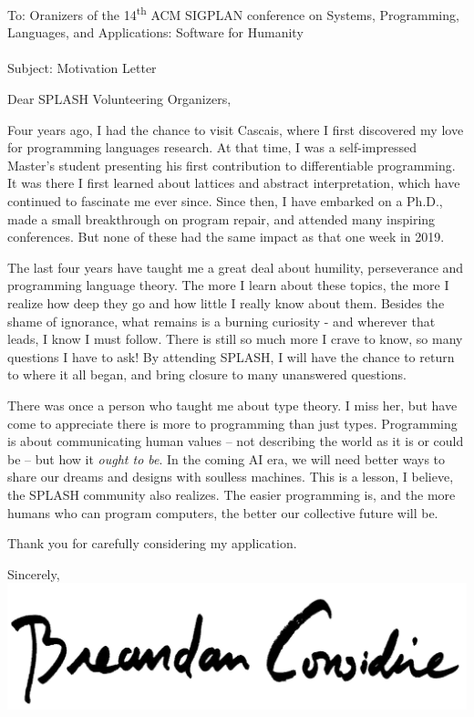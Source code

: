 \documentclass{letter}
\begin{document}
    \begin{letter}{To: Oranizers of the 14\textsuperscript{th} ACM SIGPLAN conference on Systems, Programming, Languages, and Applications: Software for Humanity\\\phantom{.}\\Subject: Motivation Letter\\}
        \opening{Dear SPLASH Volunteering Organizers,}
        Four years ago, I had the chance to visit Cascais, where I first discovered my love for programming languages research. At that time, I was a self-impressed Master’s student presenting his first contribution to differentiable programming. It was there I first learned about lattices and abstract interpretation, which have continued to fascinate me ever since. Since then, I have embarked on a Ph.D., made a small breakthrough on program repair, and attended many inspiring conferences. But none of these had the same impact as that one week in 2019.

        The last four years have taught me a great deal about humility, perseverance and programming language theory. The more I learn about these topics, the more I realize how deep they go and how little I really know about them. Besides the shame of ignorance, what remains is a burning curiosity - and wherever that leads, I know I must follow. There is still so much more I crave to know, so many questions I have to ask! By attending SPLASH, I will have the chance to return to where it all began, and bring closure to many unanswered questions.

        There was once a person who taught me about type theory. I miss her, but have come to appreciate there is more to programming than just types. Programming is about communicating human values -- not describing the world as it is or could be -- but how it \textit{ought to be}. In the coming AI era, we will need better ways to share our dreams and designs with soulless machines. This is a lesson, I believe, the SPLASH community also realizes. The easier programming is, and the more humans who can program computers, the better our collective future will be.

        Thank you for carefully considering my application.

        \closing{Sincerely,\\
        \includegraphics[scale=0.06]{signature}\\
        }
    \end{letter}
\end{document}
